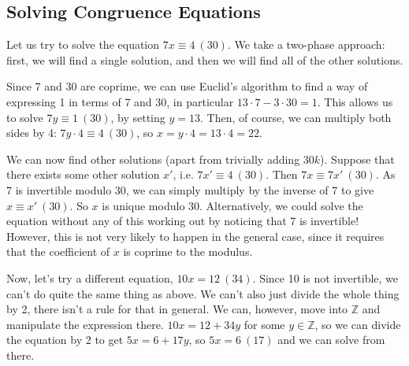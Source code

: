 \subsection{Solving Congruence Equations}
Let us try to solve the equation $7x \equiv 4\ (30)$. We take a two-phase approach: first, we will find a single solution, and then we will find all of the other solutions.

Since 7 and 30 are coprime, we can use Euclid's algorithm to find a way of expressing 1 in terms of 7 and 30, in particular $13 \cdot 7 - 3\cdot 30 = 1$. This allows us to solve $7y \equiv 1\ (30)$, by setting $y=13$. Then, of course, we can multiply both sides by 4: $7 y\cdot 4 \equiv 4\ (30)$, so $x = y \cdot 4 = 13 \cdot 4 = 22$.

We can now find other solutions (apart from trivially adding $30k$). Suppose that there exists some other solution $x'$, i.e. $7x' \equiv 4\ (30)$. Then $7x \equiv 7x'\ (30)$. As 7 is invertible modulo 30, we can simply multiply by the inverse of 7 to give $x \equiv x'\ (30)$. So $x$ is unique modulo 30. Alternatively, we could solve the equation without any of this working out by noticing that 7 is invertible! However, this is not very likely to happen in the general case, since it requires that the coefficient of $x$ is coprime to the modulus.

Now, let's try a different equation, $10x = 12\ (34)$. Since 10 is not invertible, we can't do quite the same thing as above. We can't also just divide the whole thing by 2, there isn't a rule for that in general. We can, however, move into $\mathbb Z$ and manipulate the expression there. $10x = 12 + 34y$ for some $y \in \mathbb Z$, so we can divide the equation by 2 to get $5x = 6 + 17y$, so $5x = 6\ (17)$ and we can solve from there.

